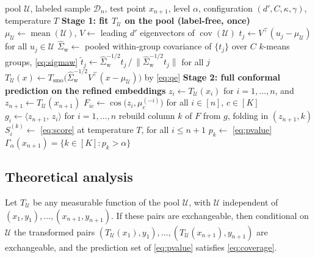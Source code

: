 \begin{algorithm}[t]
\caption{FRCP: pool-fitted refinement + full conformal prediction}
\label{alg:frcp}
\begin{algorithmic}[1]
\Require pool $\mathcal{U}$, labeled sample $\mathcal{D}_n$, test point
$x_{n+1}$, level $\alpha$, configuration $(d', C, \kappa, \gamma)$,
temperature $T$
\Statex \textbf{Stage 1: fit $T_{\mathcal{U}}$ on the pool (label-free, once)}
\State $\mu_{\mathcal{U}} \gets \operatorname{mean}(\mathcal{U})$,
       $V \gets$ leading $d'$ eigenvectors of $\operatorname{cov}(\mathcal{U})$
\State $t_j \gets V^{\top}(u_j - \mu_{\mathcal{U}})$ for all $u_j \in \mathcal{U}$
\State $\widehat\Sigma_{\mathrm{w}} \gets$ pooled within-group covariance
       of $\{t_j\}$ over $C$ $k$-means groups, \eqref{eq:sigmaw}
\State $\tilde t_j \gets \widehat\Sigma_{\mathrm{w}}^{-1/2} t_j \,\big/\,
       \bigl\| \widehat\Sigma_{\mathrm{w}}^{-1/2} t_j \bigr\|$ for all $j$
\State $T_{\mathcal{U}}(x) \gets T_{\mathrm{smo}}\bigl(\widehat\Sigma_{\mathrm{w}}^{-1/2}
       V^{\top}(x - \mu_{\mathcal{U}})\bigr)$ by \eqref{eq:qe}
\Statex \textbf{Stage 2: full conformal prediction on the refined embeddings}
\State $z_i \gets T_{\mathcal{U}}(x_i)$ for $i = 1, \dots, n$, and
       $z_{n+1} \gets T_{\mathcal{U}}(x_{n+1})$
\State $F_{ic} \gets \cos\bigl(z_i, \mu^{(-i)}_{c}\bigr)$ for all
       $i \in [n]$, $c \in [K]$
\State $g_i \gets \langle z_{n+1},\, z_i \rangle$ for $i = 1, \dots, n$
  \State rebuild column $k$ of $F$ from $g$, folding in $(z_{n+1}, k)$
  \State $S^{(k)}_i \gets$ \eqref{eq:score} at temperature $T$, for all $i \le n{+}1$
  \State $p_k \gets$ \eqref{eq:pvalue}
\EndFor
\State \Return $\Gamma_\alpha(x_{n+1}) = \{k \in [K] : p_k > \alpha\}$
\end{algorithmic}
\end{algorithm}

\subsection{Theoretical analysis}
\label{sec:theory}
\begin{proposition}
\label{prop:validity}
Let $T_{\mathcal{U}}$ be any measurable function of the pool
$\mathcal{U}$, with $\mathcal{U}$ independent of
$(x_1, y_1), \dots, (x_{n+1}, y_{n+1})$. If these pairs are
exchangeable, then conditional on $\mathcal{U}$ the transformed pairs
$(T_{\mathcal{U}}(x_1), y_1), \dots, (T_{\mathcal{U}}(x_{n+1}),
y_{n+1})$ are exchangeable, and the prediction set of
\eqref{eq:pvalue} satisfies \eqref{eq:coverage}.
\end{proposition}


